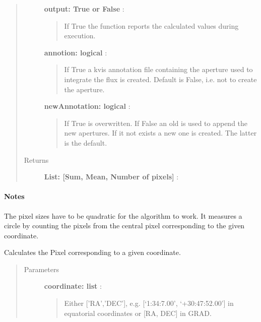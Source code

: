 \documentclass[a4paper,10pt,english]{sphinxmanual}
\begin{document}
\begin{fulllineitems}
\begin{fulllineitems}
\begin{quote}
\begin{description}
\textbf{output: True or False} :
\begin{quote}

If True the function reports the calculated values during
execution.
\end{quote}

\textbf{annotion: logical} :
\begin{quote}

If True a kvis annotation file  containing the
aperture used to integrate the flux is created. Default is False,
i.e. not to create the aperture.
\end{quote}

\textbf{newAnnotation: logical} :
\begin{quote}

If True  is overwritten. If False an old
 is used to append the new apertures. If it not
exists a new one is created. The latter is the default.
\end{quote}

\item[{Returns }] \leavevmode
\textbf{List:  {[}Sum, Mean, Number of pixels{]}} :

\end{description}\end{quote}
\paragraph{Notes}

The pixel sizes have to be quadratic for the algorithm to work. It
measures a circle by counting the pixels from the central pixel
corresponding to the given coordinate.

\end{fulllineitems}


\begin{fulllineitems}
\label{maps:astrolyze.maps.fits.FitsMap.sky2pix}
Calculates the Pixel corresponding to a given coordinate.
\begin{quote}\begin{description}
\item[{Parameters }] \leavevmode
\textbf{coordinate: list} :
\begin{quote}

Either {[}'RA','DEC'{]}, e.g. {[}`1:34:7.00', `+30:47:52.00'{]} in
equatorial coordinates or {[}RA, DEC{]} in GRAD.
\end{quote}


\end{description}
\end{quote}
\end{fulllineitems}
\end{fulllineitems}
\end{document}
